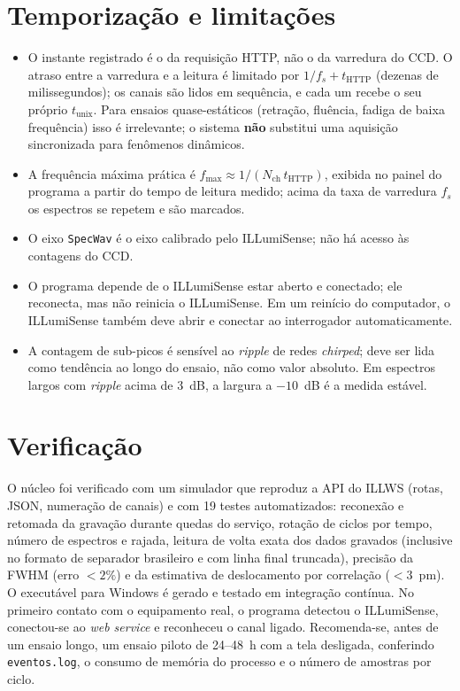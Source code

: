 \documentclass[11pt,a4paper]{article}
\begin{document}
\section{Temporização e limitações}
\label{sec:tempo}
\begin{itemize}
\item O instante registrado é o da requisição HTTP, não o da varredura do CCD. O atraso entre a
  varredura e a leitura é limitado por $1/f_s + t_{\text{HTTP}}$ (dezenas de milissegundos); os canais
  são lidos em sequência, e cada um recebe o seu próprio $t_{\text{unix}}$. Para ensaios quase-estáticos
  (retração, fluência, fadiga de baixa frequência) isso é irrelevante; o sistema \textbf{não} substitui
  uma aquisição sincronizada para fenômenos dinâmicos.
\item A frequência máxima prática é $f_{\max} \approx 1/(N_{\text{ch}}\,t_{\text{HTTP}})$, exibida no
  painel do programa a partir do tempo de leitura medido; acima da taxa de varredura $f_s$ os espectros
  se repetem e são marcados.
\item O eixo \texttt{SpecWav} é o eixo calibrado pelo ILLumiSense; não há acesso às contagens do CCD.
\item O programa depende de o ILLumiSense estar aberto e conectado; ele reconecta, mas não reinicia o
  ILLumiSense. Em um reinício do computador, o ILLumiSense também deve abrir e conectar ao
  interrogador automaticamente.
\item A contagem de sub-picos é sensível ao \emph{ripple} de redes \emph{chirped}; deve ser lida como
  tendência ao longo do ensaio, não como valor absoluto. Em espectros largos com \emph{ripple} acima de
  3~dB, a largura a $-10$~dB é a medida estável.
\end{itemize}

\section{Verificação}
O núcleo foi verificado com um simulador que reproduz a API do ILLWS (rotas, JSON, numeração de
canais) e com 19 testes automatizados: reconexão e retomada da gravação durante quedas do serviço,
rotação de ciclos por tempo, número de espectros e rajada, leitura de volta exata dos dados gravados
(inclusive no formato de separador brasileiro e com linha final truncada), precisão da FWHM
(erro $<2\%$) e da estimativa de deslocamento por correlação ($<3$~pm). O executável para Windows é
gerado e testado em integração contínua. No primeiro contato com o equipamento real, o programa
detectou o ILLumiSense, conectou-se ao \emph{web service} e reconheceu o canal ligado. Recomenda-se, antes
de um ensaio longo, um ensaio piloto de 24--48~h com a tela desligada, conferindo
\texttt{eventos.log}, o consumo de memória do processo e o número de amostras por ciclo.
\end{document}
